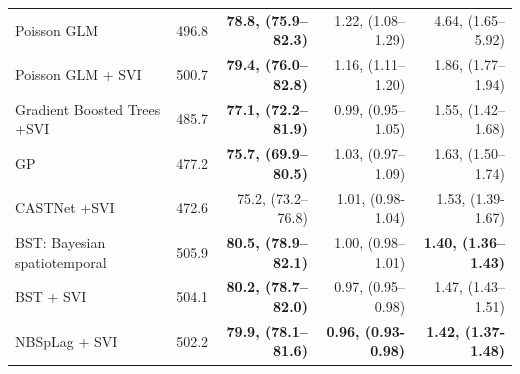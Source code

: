 \begin{table}[htbp]
{\begin{tabular}{@{}>{\hyphenpenalty=10000\exhyphenpenalty=10000\raggedright\arraybackslash}p{1.5in}rrrr@{}}
Poisson GLM & 496.8 & \textbf{78.8, (75.9--82.3)} & 1.22, (1.08--1.29) & 4.64, (1.65--5.92) \\
Poisson GLM + SVI & 500.7 & \textbf{79.4, (76.0--82.8)} & 1.16, (1.11--1.20) & 1.86, (1.77--1.94) \\
Gradient Boosted Trees +SVI & 485.7 & \textbf{77.1, (72.2--81.9)} & 0.99, (0.95--1.05) & 1.55, (1.42--1.68) \\
GP & 477.2 & \textbf{75.7, (69.9--80.5)} & 1.03, (0.97--1.09) & 1.63, (1.50--1.74) \\
CASTNet +SVI & 472.6 & 75.2, (73.2--76.8) & 1.01, (0.98-1.04) & 1.53, (1.39-1.67) \\
BST: Bayesian spatiotemporal & 505.9 & \textbf{80.5, (78.9--82.1)} & 1.00, (0.98--1.01) & \textbf{1.40, (1.36--1.43)} \\
BST + SVI & 504.1 & \textbf{80.2, (78.7--82.0)} & 0.97, (0.95--0.98) & 1.47, (1.43--1.51) \\
NBSpLag + SVI & 502.2 & \textbf{79.9, (78.1--81.6)} & \textbf{0.96, (0.93-0.98)} & \textbf{1.42, (1.37-1.48)} \\
\bottomrule
\end{tabular}%
}
\end{table}
